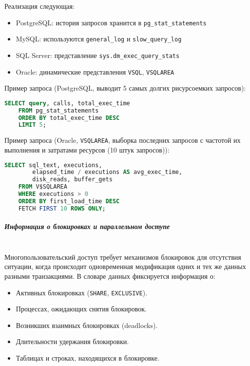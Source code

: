Реализация следующая:
\begin{itemize}
    \item PostgreSQL: история запросов хранится в \texttt{pg\_stat\_statements} \autocite{PgStatStatements1}
    \item MySQL: используются \texttt{general\_log} и \texttt{slow\_query\_log} \autocite{Mysqldoc3}
    \item SQL Server: представление \texttt{sys.dm\_exec\_query\_stats} \autocite{MicrosoftLearnSQLserverQueryStat}
    \item Oracle: динамические представления \texttt{V\textdollar SQL}, \texttt{V\textdollar SQLAREA} \autocite[c.9 §46-49, c.9 §71]{oracledbdoc2}
\end{itemize}

Пример запроса (PostgreSQL, выводит 5 самых долгих рисурсоемких запросов):
\begin{lstlisting}[language=SQL]
    SELECT query, calls, total_exec_time 
    FROM pg_stat_statements 
    ORDER BY total_exec_time DESC 
    LIMIT 5;                 
\end{lstlisting}

Пример запроса (Oracle, \texttt{V\textdollar SQLAREA}, выборка последних запросов с частотой их выполнения и затратами ресурсов (10 штук запросов)):
\begin{lstlisting}[language=SQL]
    SELECT sql_text, executions, 
        elapsed_time / executions AS avg_exec_time, 
        disk_reads, buffer_gets 
    FROM V$SQLAREA 
    WHERE executions > 0 
    ORDER BY first_load_time DESC 
    FETCH FIRST 10 ROWS ONLY;
\end{lstlisting}

\subparagraph{Информация о блокировках и параллельном доступе} ~\\

Многопользовательский доступ требует механизмов блокировок для отсутствия ситуации, когда происходит одновременная модификация одних и тех же данных разными транзакциями. В словаре данных фиксируется информация о:
\begin{itemize}
    \item Активных блокировках (\texttt{SHARE}, \texttt{EXCLUSIVE}).
    \item Процессах, ожидающих снятия блокировок.
    \item Возникших взаимных блокировках (deadlocks).
    \item Длительности удержания блокировки.
    \item Таблицах и строках, находящихся в блокировке.
\end{itemize}

